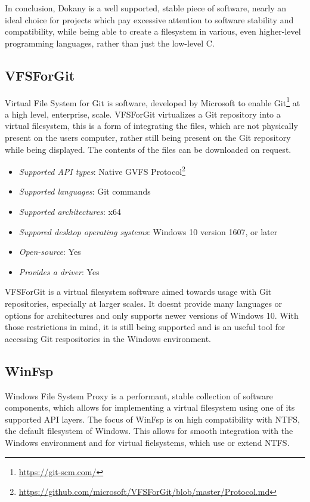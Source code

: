 In conclusion, Dokany is a well supported, stable piece of software, nearly an ideal choice for projects which pay excessive attention to software stability and compatibility, while being able to create a filesystem in various, even higher-level programming languages, rather than just the low-level C.\cite{GitDokany}\cite{DokanDevIo}

\subsection*{VFSForGit}
Virtual File System for Git is software, developed by Microsoft to enable Git\footnote{\url{https://git-scm.com/}} at a high level, enterprise, scale. VFSForGit virtualizes a Git repository into a virtual filesystem, this is a form of integrating the files, which are not physically present on the users computer, rather still being present on the Git repository while being displayed. The contents of the files can be downloaded on request. 

\begin{itemize}
    \item \textit{Supported API types}: Native GVFS Protocol\footnote{\url{https://github.com/microsoft/VFSForGit/blob/master/Protocol.md}}
    \item \textit{Supported languages}: Git commands
    \item \textit{Supported architectures}: x64
    \item \textit{Suppored desktop operating systems}: Windows 10 version 1607, or later
    \item \textit{Open-source}: Yes
    \item \textit{Provides a driver}: Yes
\end{itemize}

VFSForGit is a virtual filesystem software aimed towards usage with Git repositories, especially at larger scales. It doesnt provide many languages or options for architectures and only supports newer versions of Windows 10. With those restrictions in mind, it is still being supported and is an useful tool for accessing Git respositories in the Windows environment.\cite{GitVfsForGit}\cite{VfsForGitMS}

\subsection*{WinFsp}
Windows File System Proxy is a performant, stable collection of software components, which allows for implementing a virtual filesystem using one of its supported API layers. The focus of WinFsp is on high compatibility with NTFS, the default filesystem of Windows. This allows for smooth integration with the Windows environment and for virtual fielsystems, which use or extend NTFS.

